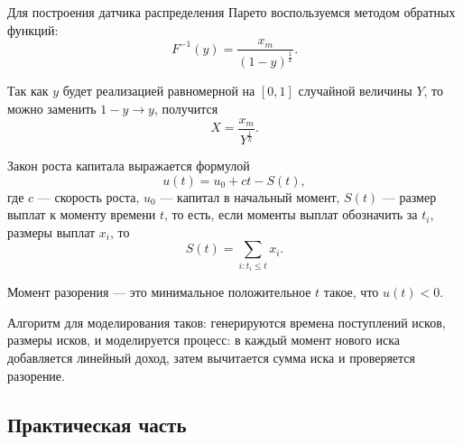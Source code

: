 \documentclass[12pt, a4paper]{article}
\begin{document}
Для построения датчика распределения Парето воспользуемся методом обратных функций: 
\[F^{-1}(y) = \frac{x_m}{(1-y)^{\frac{1}{k}}}.\]

Так как $y$ будет реализацией равномерной на $[0,1]$ случайной величины $Y$, то можно заменить $1-y \to y$, получится 
\[ X = \frac{x_m}{Y^\frac{1}{k}}.\]

Закон роста капитала выражается формулой
\[ u(t) = u_0 + ct - S(t),\]
где $c$ --- скорость роста, $u_0$ --- капитал в начальный момент, $S(t)$ --- размер выплат к моменту времени $t$, то есть, если моменты выплат обозначить за $t_i$, размеры выплат $x_i$, то \[S(t) = \sum\limits_{i:t_i\leqslant t}x_i.\]

Момент разорения --- это минимальное положительное $t$ такое, что $u(t)<0$.

Алгоритм для моделирования таков: генерируются времена поступлений исков, размеры исков, и моделируется процесс: в каждый момент нового иска добавляется линейный доход, затем вычитается сумма иска и проверяется разорение.

\subsection{Практическая часть}
\end{document}
